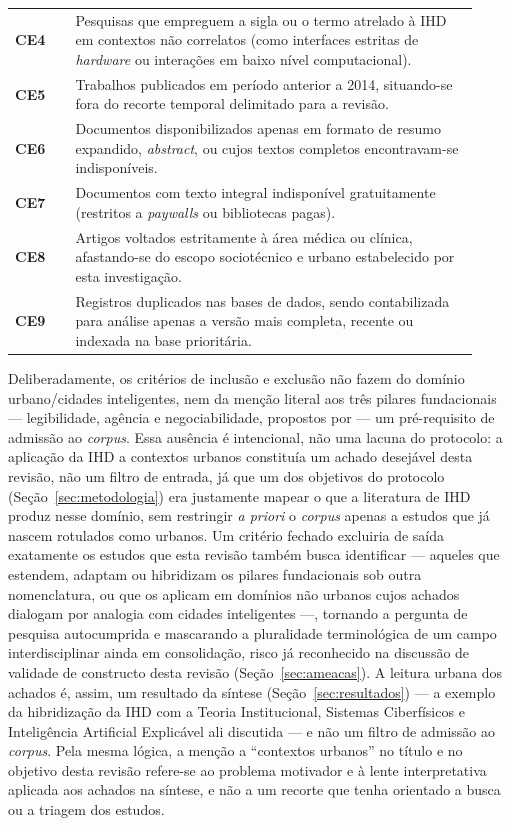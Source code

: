 \documentclass[12pt]{article}
\begin{document}
\begin{table}[H]
\begin{tabular}{p{0.12\linewidth} p{0.8\linewidth}}
\textbf{CE4} & Pesquisas que empreguem a sigla ou o termo atrelado à IHD em contextos não correlatos (como interfaces estritas de \textit{hardware} ou interações em baixo nível computacional). \\
\textbf{CE5} & Trabalhos publicados em período anterior a 2014, situando-se fora do recorte temporal delimitado para a revisão. \\
\textbf{CE6} & Documentos disponibilizados apenas em formato de resumo expandido, \textit{abstract}, ou cujos textos completos encontravam-se indisponíveis. \\
\textbf{CE7} & Documentos com texto integral indisponível gratuitamente (restritos a \textit{paywalls} ou bibliotecas pagas). \\
\textbf{CE8} & Artigos voltados estritamente à área médica ou clínica, afastando-se do escopo sociotécnico e urbano estabelecido por esta investigação. \\
\textbf{CE9} & Registros duplicados nas bases de dados, sendo contabilizada para análise apenas a versão mais completa, recente ou indexada na base prioritária. \\
\hline
\end{tabular}
\end{table}

Deliberadamente, os critérios de inclusão e exclusão não fazem do domínio urbano/cidades inteligentes, nem da menção literal aos três pilares fundacionais --- legibilidade, agência e negociabilidade, propostos por \cite{mortier2015humandatainteractionhumanface} --- um pré-requisito de admissão ao \textit{corpus}. Essa ausência é intencional, não uma lacuna do protocolo: a aplicação da IHD a contextos urbanos constituía um achado desejável desta revisão, não um filtro de entrada, já que um dos objetivos do protocolo (Seção~\ref{sec:metodologia}) era justamente mapear o que a literatura de IHD produz nesse domínio, sem restringir \textit{a priori} o \textit{corpus} apenas a estudos que já nascem rotulados como urbanos. Um critério fechado excluiria de saída exatamente os estudos que esta revisão também busca identificar --- aqueles que estendem, adaptam ou hibridizam os pilares fundacionais sob outra nomenclatura, ou que os aplicam em domínios não urbanos cujos achados dialogam por analogia com cidades inteligentes ---, tornando a pergunta de pesquisa autocumprida e mascarando a pluralidade terminológica de um campo interdisciplinar ainda em consolidação, risco já reconhecido na discussão de validade de constructo desta revisão (Seção~\ref{sec:ameacas}). A leitura urbana dos achados é, assim, um resultado da síntese (Seção~\ref{sec:resultados}) --- a exemplo da hibridização da IHD com a Teoria Institucional, Sistemas Ciberfísicos e Inteligência Artificial Explicável ali discutida --- e não um filtro de admissão ao \textit{corpus}. Pela mesma lógica, a menção a ``contextos urbanos'' no título e no objetivo desta revisão refere-se ao problema motivador e à lente interpretativa aplicada aos achados na síntese, e não a um recorte que tenha orientado a busca ou a triagem dos estudos.
\end{document}
